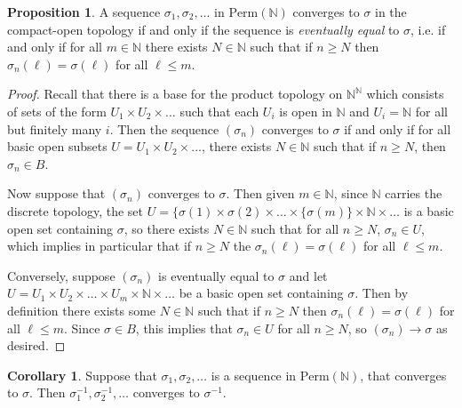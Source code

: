 \documentclass[oneside,11pt]{amsart}
\newcommand{\nn}{\ensuremath{\mathbb{N}}}
\newcommand{\Perm}{\ensuremath{\text{Perm}}}
\theoremstyle{definition}
\newtheorem{proof techniques}{Proof Techniques}
\newtheorem{corollary}{Corollary}
\newtheorem{proposition}{Proposition}
\begin{document}


\begin{proposition}
A sequence $\sigma_1 , \sigma_2 , \ldots $ in $\Perm(\nn)$ converges to $\sigma$ in the compact-open topology if and only if the sequence is \emph{eventually equal} to $\sigma$, i.e. if and only if for all $m \in \nn$ there exists $N \in \nn$ such that if $n \geq N$ then $\sigma_n(\ell) = \sigma(\ell)$ for all $\ell \leq m$. 
\end{proposition}

\begin{proof}
Recall that there is a base for the product topology on $\nn^\nn$ which consists of sets of the form $U_1 \times U_2 \times \ldots $ such that each $U_i$ is open in $\nn$ and $U_i = \nn$ for all but finitely many $i$. Then the sequence $(\sigma_n)$ converges to $\sigma$ if and only if for all basic open subsets $U = U_1 \times U_2 \times \ldots $, there exists $N \in \nn$ such that if $n \geq N$, then $\sigma_n \in B$. 

Now suppose that $(\sigma_n)$ converges to $\sigma$. Then given $m \in \nn$, since $\nn$ carries the discrete topology, the set $U = \{ \sigma(1)  \times \sigma(2) \times \ldots \times \{ \sigma(m) \} \times \nn \times \ldots$ is a basic open set containing $\sigma$, so there exists $N \in \nn$ such that for all $n \geq N$, $\sigma_n \in U$, which implies in particular that if $n \geq N$ the $\sigma_n(\ell) = \sigma(\ell)$ for all $\ell \leq m$. 

Conversely, suppose $(\sigma_n)$ is eventually equal to $\sigma$ and let $U = U_1 \times U_2 \times \ldots \times U_m \times \nn \times \ldots$ be a basic open set containing $\sigma$. Then by definition there exists some $N \in \nn$ such that if $n \geq N$ then $\sigma_n(\ell) = \sigma(\ell)$ for all $\ell \leq m$. Since $\sigma \in B$, this implies that $\sigma_n \in U$ for all $n \geq N$, so $(\sigma_n) \to \sigma$ as desired. 
\end{proof}


\begin{corollary}\label{cor: inverse of a convergent sequence is convergent}
Suppose that $\sigma_1 , \sigma_2, \ldots $ is a sequence in $\Perm(\nn)$, that converges to $\sigma$. Then $\sigma_1^{-1} , \sigma_2^{-1}, \ldots$ converges to $\sigma^{-1}$.
\end{corollary}
\end{document}
